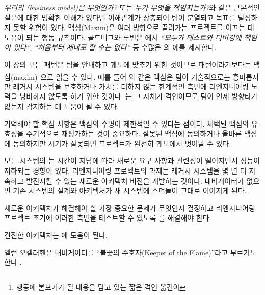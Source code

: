 \documentclass[a4paper,10pt,twoside]{book}
\begin{document}
\emph{우리의 (business model)은 무엇인가?} 또는 \emph{누가 무엇을 책임지는가?}와 같은 근본적인 질문에 대한 명확한 이해가 없다면 이해관계가 상충되어 팀이 분열되고 목표를 달성하지 못할 위험이 있다. 맥심(Maxim)은 여러 방향으로 끌려가는 프로젝트를 이끄는 데 도움이 되는 행동 규칙이다. 골드버그와 루빈은 \cite{Gold95a}에서 \emph{``모두가 테스트와 디버깅에 책임이 있다''}, \emph{``처음부터 제대로 할 수는 없다''} 등 수많은 의 예를 제시한다.

이 장의 모든 패턴은 팀을 안내하고 궤도에 맞추기 위한 것이므로 패턴이라기보다는 맥심(maxim)\footnote{행동에 본보기가 될 내용을 담고 있는 짧은 격언-옮긴이}으로 읽을 수 있다. 예를 들어 와 같은 맥심은 팀이 기술적으로는 흥미롭지만 레거시 시스템을 보호하거나 가치를 더하지 않는 한계적인 측면에 리엔지니어링 노력을 낭비하지 않도록 하기 위한 것이다. 는 그 자체가 격언이므로 팀이 언제 방향타가 없는지 감지하는 데 도움이 될 수 있다.

기억해야 할 핵심 사항은 맥심의 수명이 제한적일 수 있다는 점이다. 채택된 맥심의 유효성을 주기적으로 재평가하는 것이 중요하다. 잘못된 맥심에 동의하거나 올바른 맥심에 동의하지만 시기가 잘못되면 프로젝트가 완전히 궤도에서 벗어날 수 있다.




\discussion
모든 시스템의 는 시간이 지남에 따라 새로운 요구 사항과 관련성이 떨어지면서 성능이 저하되는 경향이 있다. 리엔지니어링 프로젝트의 과제는 레거시 시스템을 몇 년 더 지속하고 발전시킬 수 있는 새로운 아키텍처 비전을 개발하는 것이다. 내비게이터가 없으면 기존 시스템의 설계와 아키텍처가 새 시스템에 스며들어 그대로 이어지게 된다.

새로운 아키텍처가 해결해야 할 가장 중요한 문제가 무엇인지 결정하고 리엔지니어링 프로젝트 초기에 이러한 측면을 테스트할 수 있도록 를 해결해야 한다.

건전한 아키텍처는 에 도움이 된다.

앨런 오캘러핸은 내비게이터를 ``불꽃의 수호자(Keeper of the Flame)''라고 부르기도 한다 \cite{Ocal99a}.
\end{document}
